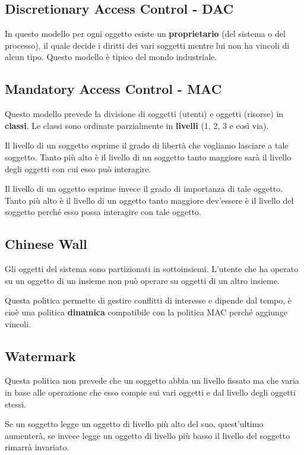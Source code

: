 \subsection{Discretionary Access Control - DAC}
In questo modello per ogni oggetto esiste un \textbf{proprietario} (del sistema o del processo), il quale decide i
diritti dei vari soggetti mentre lui non ha vincoli di alcun tipo. Questo modello è tipico del mondo industriale.

\subsection{Mandatory Access Control - MAC}
Questo modello prevede la divisione di soggetti (utenti) e oggetti (risorse) in \textbf{classi}. Le classi sono
ordinate parzialmente in \textbf{livelli} (1, 2, 3 e così via).

Il livello di un soggetto esprime il grado di libertà che vogliamo lasciare a tale soggetto. Tanto più alto è il
livello di un soggetto tanto maggiore sarà il livello degli oggetti con cui esso può interagire.

Il livello di un oggetto esprime invece il grado di importanza di tale oggetto. Tanto più alto è il livello di un
oggetto tanto maggiore dev'essere è il livello del soggetto perché esso possa interagire con tale oggetto.

\subsection{Chinese Wall}
Gli oggetti del sistema sono partizionati in sottoinsiemi. L'utente che ha operato su un oggetto di un insieme non
può operare su oggetti di un altro insieme.

Questa politica permette di gestire conflitti di interesse e dipende dal tempo, è cioè una politica \textbf{dinamica}
compatibile con la politica MAC perché aggiunge vincoli.

\subsection{Watermark}
Questa politica non prevede che un soggetto abbia un livello fissato ma che varia in base alle operazione che esso
compie sui vari oggetti e dal livello degli oggetti stessi.

Se un soggetto legge un oggetto di livello più alto del suo, quest'ultimo aumenterà, se invece legge un oggetto di
livello più basso il livello del soggetto rimarrà invariato.